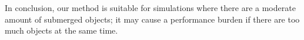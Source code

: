 In conclusion, our method is suitable for simulations where there are a moderate amount of submerged objects;
it may cause a performance burden if there are too much objects at the same time.


